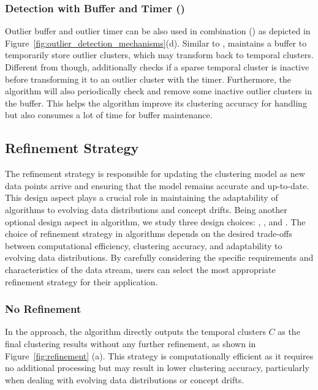 \subcompact
\subsubsection{Detection with Buffer and Timer (\buffertimer)}
\label{subsec:buffertimer}
Outlier buffer and outlier timer can be also used in combination (\buffertimer) as depicted in Figure~\ref{fig:outlier_detection_mechanisms}(d).
Similar to \buffer, \buffertimer maintains a buffer to temporarily store outlier clusters, which may transform back to temporal clusters. Different from \buffer though, \buffertimer additionally checks if a sparse temporal cluster is inactive before transforming it to an outlier cluster with the timer. Furthermore, the algorithm will also periodically check and remove some inactive outlier clusters in the buffer. This helps the algorithm improve its clustering accuracy for handling \oef but also consumes a lot of time for buffer maintenance.

\subsection{Refinement Strategy}
\label{sec:refinement_strategy}
The refinement strategy is responsible for updating the clustering model as new data points arrive and ensuring that the model remains accurate and up-to-date. This design aspect plays a crucial role in maintaining the adaptability of \dsc algorithms to evolving data distributions and concept drifts. Being another optional design aspect in \dsc algorithm, we study three design choices: \norefinement, \oneshotRefinement, and \incrementalRefinement. The choice of refinement strategy in \dsc algorithms depends on the desired trade-offs between computational efficiency, clustering accuracy, and adaptability to evolving data distributions. By carefully considering the specific requirements and characteristics of the data stream, users can select the most appropriate refinement strategy for their application.

\subsubsection{No Refinement}
\label{sec:no_refinement}
In the \norefinement approach, the algorithm directly outputs the temporal clusters $C$ as the final clustering results without any further refinement, as shown in Figure~\ref{fig:refinement} (a). This strategy is computationally efficient as it requires no additional processing but may result in lower clustering accuracy, particularly when dealing with evolving data distributions or concept drifts.

